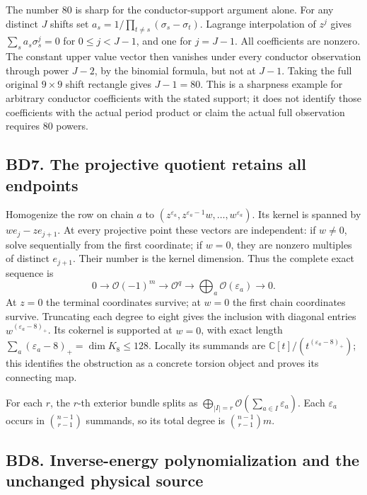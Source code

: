 \documentclass[11pt]{article}
\begin{document}
The number 80 is sharp for the conductor-support argument alone. For any distinct \(J\) shifts set \(a_s=1/\prod_{t\ne s}(\sigma_s-\sigma_t)\). Lagrange interpolation of \(z^j\) gives \(\sum_s a_s\sigma_s^j=0\) for \(0\le j<J-1\), and one for \(j=J-1\). All coefficients are nonzero. The constant upper value vector then vanishes under every conductor observation through power \(J-2\), by the binomial formula, but not at \(J-1\). Taking the full original \(9\times9\) shift rectangle gives \(J-1=80\). This is a sharpness example for arbitrary conductor coefficients with the stated support; it does not identify those coefficients with the actual period product or claim the actual full observation requires 80 powers.

\subsection{BD7. The projective quotient retains all endpoints}\label{bd7.-the-projective-quotient-retains-all-endpoints}

Homogenize the row on chain \(a\) to \((z^{\varepsilon_a},z^{\varepsilon_a-1}w,\ldots,w^{\varepsilon_a})\). Its kernel is spanned by \(we_j-ze_{j+1}\). At every projective point these vectors are independent: if \(w\ne0\), solve sequentially from the first coordinate; if \(w=0\), they are nonzero multiples of distinct \(e_{j+1}\). Their number is the kernel dimension. Thus the complete exact sequence is \[
0\longrightarrow\mathcal O(-1)^m\longrightarrow\mathcal O^q
\longrightarrow\bigoplus_a\mathcal O(\varepsilon_a)\longrightarrow0. \tag{BD11}
\] At \(z=0\) the terminal coordinates survive; at \(w=0\) the first chain coordinates survive. Truncating each degree to eight gives the inclusion with diagonal entries \(w^{(\varepsilon_a-8)_+}\). Its cokernel is supported at \(w=0\), with exact length \(\sum_a(\varepsilon_a-8)_+=\dim K_8\le128\). Locally its summands are \(\mathbb C[t]/(t^{(\varepsilon_a-8)_+})\); this identifies the obstruction as a concrete torsion object and proves its connecting map.

For each \(r\), the \(r\)-th exterior bundle splits as \(\bigoplus_{|I|=r}\mathcal O(\sum_{a\in I}\varepsilon_a)\). Each \(\varepsilon_a\) occurs in \(\binom{n-1}{r-1}\) summands, so its total degree is \(\binom{n-1}{r-1}m\).

\subsection{BD8. Inverse-energy polynomialization and the unchanged physical source}\label{bd8.-inverse-energy-polynomialization-and-the-unchanged-physical-source}
\end{document}
